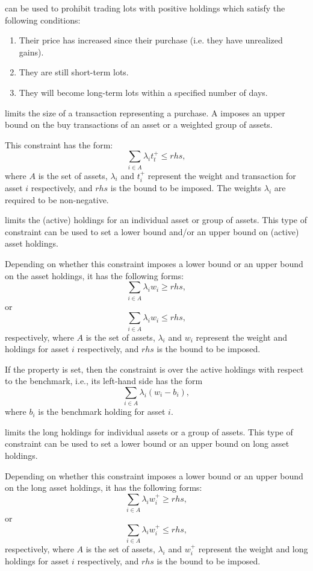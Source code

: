     can be used to prohibit trading lots with positive holdings which satisfy the following conditions: 
    \begin{enumerate}
    \item Their price has increased since their purchase (i.e. they have unrealized gains). 
    \item They are still short-term lots. 
    \item They will become long-term lots within a specified number of days. 
    \end{enumerate}

   limits the size of a transaction representing a purchase. 
   A  imposes an upper bound on the buy transactions of an asset or a weighted group of assets. 

   This constraint has the form: 
   \[
      \sum_{i\in A}\lambda_it_t^+ \le rhs,
   \]
   where $A$ is the set of assets, $\lambda_i$ and $t_i^+$ represent the weight and transaction for asset $i$ respectively,
   and $rhs$ is the bound to be imposed. 
   The weights $\lambda_i$ are required to be non-negative. 

   limits the (active) holdings for an individual asset or group of assets. 
   This type of constraint can be used to set a lower bound and/or an upper bound on (active) asset holdings. 
 
   Depending on whether this constraint imposes a lower bound or an upper bound on the asset holdings, 
   it has the following forms: 
   \[
      \sum_{i\in A}\lambda_i w_i \ge rhs,
   \]
   or
   \[
      \sum_{i\in A}\lambda_i w_i \le rhs,
   \]
   respectively, 
   where $A$ is the set of assets, $\lambda_i$ and $w_i$ represent the weight and holdings for asset $i$ respectively, 
   and $rhs$ is the bound to be imposed.  
  
   If the  property is set, 
   then the constraint is over the active holdings with respect to the benchmark, i.e., its left-hand side has the form 
   \[
       \sum_{i\in A}\lambda_i (w_i -b_i),
   \]
   where $b_i$ is the benchmark holding for asset $i$.
 
   limits the long holdings for individual assets or a group of assets. 
   This type of constraint can be used to set a lower bound or an upper bound on long asset holdings. 

  Depending on whether this constraint imposes a lower bound or an upper bound on the long asset holdings, 
  it has the following forms: 
  \[
      \sum_{i\in A}\lambda_i w_i^+ \ge rhs,
   \]
   or
   \[
      \sum_{i\in A}\lambda_i w_i^+ \le rhs,
   \]
   respectively, 
   where $A$ is the set of assets, $\lambda_i$ and $w_i^+$ represent the weight and long holdings for asset $i$ respectively, 
   and $rhs$ is the bound to be imposed. 

